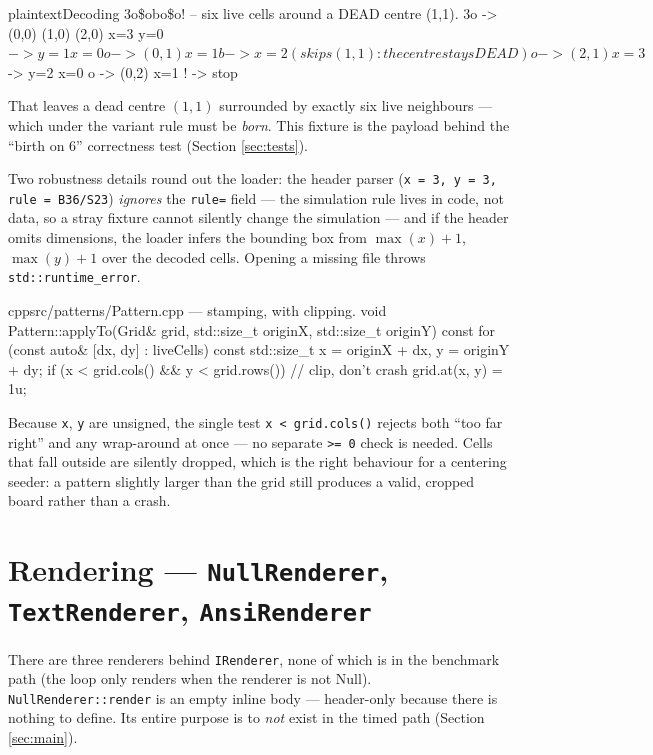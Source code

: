 \documentclass[
	english,
	letterpaper, oneside
]{article}
\begin{document}
\begin{sourcecode}{plaintext}{Decoding 3o\$obo\$o! -- six live cells around a DEAD centre (1,1).}
3o   -> (0,0) (1,0) (2,0)      x=3 y=0
$    -> y=1 x=0
o    -> (0,1)                  x=1
b    -> x=2                    (skips (1,1): the centre stays DEAD)
o    -> (2,1)                  x=3
$    -> y=2 x=0
o    -> (0,2)                  x=1
!    -> stop
\end{sourcecode}

That leaves a dead centre $(1,1)$ surrounded by exactly six live neighbours ---
which under the variant rule must be \emph{born}. This fixture is the payload
behind the ``birth on 6'' correctness test (Section \ref{sec:tests}).

Two robustness details round out the loader: the header parser
(\texttt{x = 3, y = 3, rule = B36/S23}) \emph{ignores} the \texttt{rule=} field
--- the simulation rule lives in code, not data, so a stray fixture cannot
silently change the simulation --- and if the header omits dimensions, the loader
infers the bounding box from $\max(x)+1$, $\max(y)+1$ over the decoded cells.
Opening a missing file throws \texttt{std::runtime\_error}.

\begin{sourcecode}{cpp}{src/patterns/Pattern.cpp --- stamping, with clipping.}
void Pattern::applyTo(Grid& grid, std::size_t originX, std::size_t originY) const {
  for (const auto& [dx, dy] : liveCells) {
    const std::size_t x = originX + dx, y = originY + dy;
    if (x < grid.cols() && y < grid.rows())   // clip, don't crash
      grid.at(x, y) = 1u;
  }
}
\end{sourcecode}

Because \texttt{x}, \texttt{y} are unsigned, the single test
\texttt{x < grid.cols()} rejects both ``too far right'' and any wrap-around at
once --- no separate \texttt{>= 0} check is needed. Cells that fall outside are
silently dropped, which is the right behaviour for a centering seeder: a pattern
slightly larger than the grid still produces a valid, cropped board rather than a
crash.

\section{Rendering --- \texttt{NullRenderer}, \texttt{TextRenderer}, \texttt{AnsiRenderer}}
\label{sec:render}

There are three renderers behind \texttt{IRenderer}, none of which is in the
benchmark path (the loop only renders when the renderer is not Null).
\texttt{NullRenderer::render} is an empty inline body --- header-only because
there is nothing to define. Its entire purpose is to \emph{not} exist in the
timed path (Section \ref{sec:main}).
\end{document}
